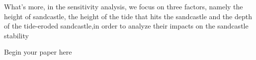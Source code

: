 \documentclass[12pt]{article}
\begin{document}
What's more, in the sensitivity analysis, we focus on three factors, namely the height of sandcastle, the height of the tide that hits the sandcastle and the depth of the tide-eroded sandcastle,in order to analyze their impacts on the sandcastle stability

\clearpage
\pagestyle{fancy}
\newpage
\setcounter{page}{1}
Begin your paper here


\end{document}
